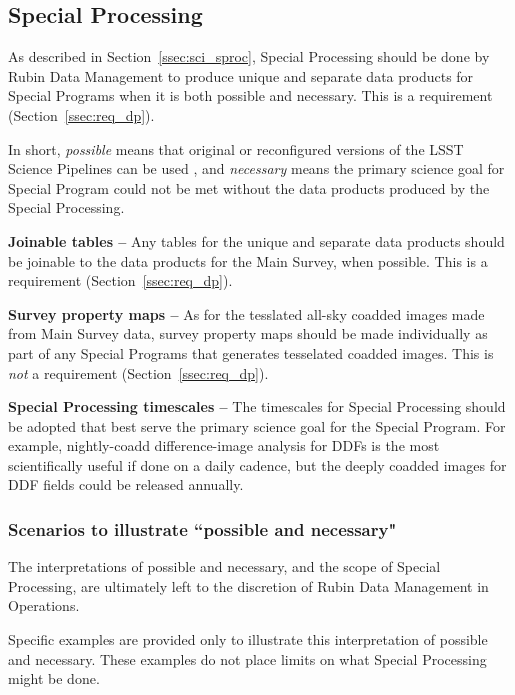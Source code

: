 \subsection{Special Processing}\label{ssec:proc_special}

As described in Section~\ref{ssec:sci_sproc}, 
Special Processing should be done by Rubin Data Management to 
produce unique and separate data products
for Special Programs when it is both possible and necessary.
This is a requirement (Section~\ref{ssec:req_dp}).

In short, \emph{possible} means that original or reconfigured versions of the LSST
Science Pipelines can be used , and \emph{necessary} means the primary science goal for Special Program
could not be met without the data products produced by the Special Processing.

\textbf{Joinable tables --}
Any tables for the unique and separate data products should be joinable to the 
data products for the Main Survey, when possible.
This is a requirement (Section~\ref{ssec:req_dp}).

\textbf{Survey property maps --}
As for the tesslated all-sky coadded images made from Main Survey data, survey property maps
should be made individually as part of any Special Programs that generates
tesselated coadded images. This is \emph{not} a requirement (Section~\ref{ssec:req_dp}).

\textbf{Special Processing timescales --}
The timescales for Special Processing should be adopted that best serve the
primary science goal for the Special Program.
For example, nightly-coadd difference-image analysis for DDFs is the most
scientifically useful if done on a daily cadence, but the deeply coadded
images for DDF fields could be released annually.

\subsubsection{Scenarios to illustrate ``possible and necessary"}

The interpretations of possible and necessary, and the scope of Special Processing,
are ultimately left to the discretion of Rubin Data Management in Operations.

Specific examples are provided only to illustrate this interpretation of possible and necessary.
These examples do not place limits on what Special Processing might be done.

